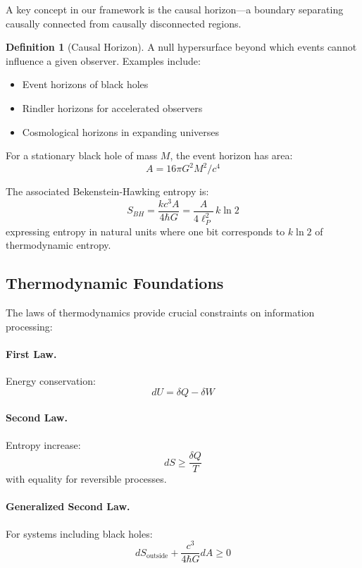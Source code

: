 \documentclass[11pt,a4paper]{article}
\theoremstyle{plain}
\theoremstyle{definition}
\newtheorem{definition}[theorem]{Definition}
\theoremstyle{remark}
\begin{document}
A key concept in our framework is the causal horizon—a boundary separating causally connected from causally disconnected regions.

\begin{definition}[Causal Horizon]
A null hypersurface beyond which events cannot influence a given observer. Examples include:
\begin{itemize}
\item Event horizons of black holes
\item Rindler horizons for accelerated observers
\item Cosmological horizons in expanding universes
\end{itemize}
\end{definition}

For a stationary black hole of mass $M$, the event horizon has area:
\begin{equation}
A = 16\pi G^2 M^2/c^4
\end{equation}

The associated Bekenstein-Hawking entropy is:
\begin{equation}
S_{BH} = \frac{kc^3 A}{4\hbar G} = \frac{A}{4\ell_P^2}\,k\ln 2
\end{equation}
expressing entropy in natural units where one bit corresponds to $k\ln 2$ of thermodynamic entropy.

\subsection{Thermodynamic Foundations}

The laws of thermodynamics provide crucial constraints on information processing:

\paragraph{First Law.} Energy conservation:
\begin{equation}
dU = \delta Q - \delta W
\end{equation}

\paragraph{Second Law.} Entropy increase:
\begin{equation}
dS \geq \frac{\delta Q}{T}
\end{equation}
with equality for reversible processes.

\paragraph{Generalized Second Law.} For systems including black holes:
\begin{equation}
dS_{\text{outside}} + \frac{c^3}{4\hbar G}dA \geq 0
\end{equation}
\end{document}
